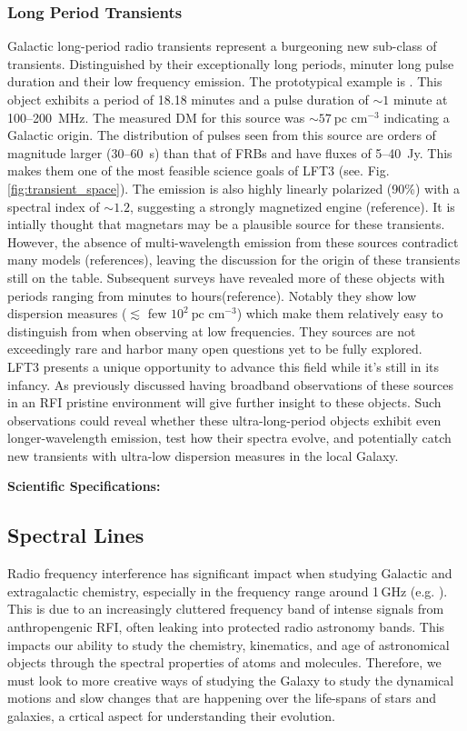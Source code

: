\subsubsection{Long Period Transients}

Galactic long-period radio transients represent a burgeoning new sub-class of transients. Distinguished by their exceptionally long periods, minuter long pulse duration and their low frequency emission. The prototypical example is \cite{hurley_walker_radio_2022}. This object exhibits a period of 18.18 minutes and a pulse duration of $\sim 1$ minute at 100--200~MHz. The measured DM for this source was $\sim57~\text{pc cm}^{-3}$ indicating a Galactic origin. The distribution of pulses seen from this source are orders of magnitude larger (30--60~s) than that of FRBs and have fluxes of 5--40~Jy. This makes them one of the most feasible science goals of LFT3 (see. Fig. \ref{fig:transient_space}). The emission is also highly linearly polarized (90\%) with a spectral index of $\sim 1.2$, suggesting a strongly magnetized engine (reference). It is intially thought that magnetars may be a plausible source for these transients. However, the absence of multi-wavelength emission from these sources contradict many models (references), leaving the discussion for the origin of these transients still on the table. Subsequent surveys have revealed more of these objects with periods ranging from minutes to hours(reference). Notably they show low dispersion measures ($\lesssim$ few $10^2~\text{pc cm}^{-3}$) which make them relatively easy to distinguish from when observing at low frequencies. They sources are not exceedingly rare and harbor many open questions yet to be fully explored. \\ 
LFT3 presents a unique opportunity to advance this field while it's still in its infancy. As previously discussed having broadband observations of these sources in an RFI pristine environment will give further insight to these objects. Such observations could reveal whether these ultra-long-period objects exhibit even longer-wavelength emission, test how their spectra evolve, and potentially catch new transients with ultra-low dispersion measures in the local Galaxy.

\textbf{Scientific Specifications:}


\subsection{Spectral Lines}
Radio frequency interference has significant impact when studying Galactic and extragalactic chemistry, especially in the frequency range around 1\,GHz (e.g. \citealt{Liang_2023}). This is due to an increasingly cluttered frequency band of intense signals from anthropengenic RFI, often leaking into protected radio astronomy bands. This impacts our ability to study the chemistry, kinematics, and age of astronomical objects through the spectral properties of atoms and molecules. Therefore, we must look to more creative ways of studying the Galaxy to study the dynamical motions and slow changes that are happening over the life-spans of stars and galaxies, a crtical aspect for understanding their evolution.

